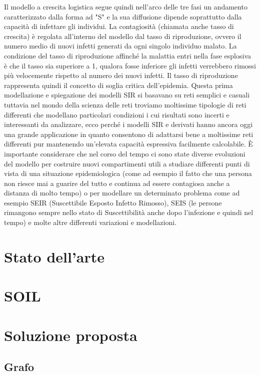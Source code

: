 \documentclass[11pt]{article}
\begin{document}
Il modello a crescita logistica segue quindi nell'arco delle tre fasi un andamento caratterizzato dalla forma ad "S" e la sua diffusione dipende soprattutto dalla capacità di infettare gli individui. La contagiosità (chiamata anche tasso di crescita) è regolata all'interno del modello dal tasso di riproduzione, ovvero il numero medio di nuovi infetti generati da ogni singolo individuo malato.
La condizione del tasso di riproduzione affinché la malattia entri nella fase esplosiva è che il tasso sia superiore a 1, qualora fosse inferiore gli infetti verrebbero rimossi più velocemente rispetto al numero dei nuovi infetti. Il tasso di riproduzione rappresenta quindi il concetto di soglia critica dell'epidemia.
Questa prima modellazione e spiegazione dei modelli SIR si basavano su reti semplici e casuali tuttavia nel mondo della scienza delle reti troviamo moltissime tipologie di reti differenti che modellano particolari condizioni i cui risultati sono incerti e interessanti da analizzare, ecco perché i modelli SIR e derivati hanno ancora oggi una grande applicazione in quanto consentono di adattarsi bene a moltissime reti differenti pur mantenendo un'elevata capacità espressiva facilmente calcolabile.
È importante considerare che nel corso del tempo ci sono state diverse evoluzioni del modello per costruire nuovi compartimenti utili a studiare differenti punti di vista di una situazione epidemiologica (come ad esempio il fatto che una persona non riesce mai a guarire del tutto e continua ad essere contagiosa anche a distanza di molto tempo) o per modellare un determinato problema come ad esempio SEIR (Suscettibile Esposto Infetto Rimosso), SEIS (le persone rimangono sempre nello stato di Suscettibilità anche dopo l'infezione e quindi nel tempo) e molte altre differenti variazioni e modellazioni.

\section{Stato dell'arte}

\section{SOIL}

\section{Soluzione proposta}

\subsection{Grafo}
\end{document}
